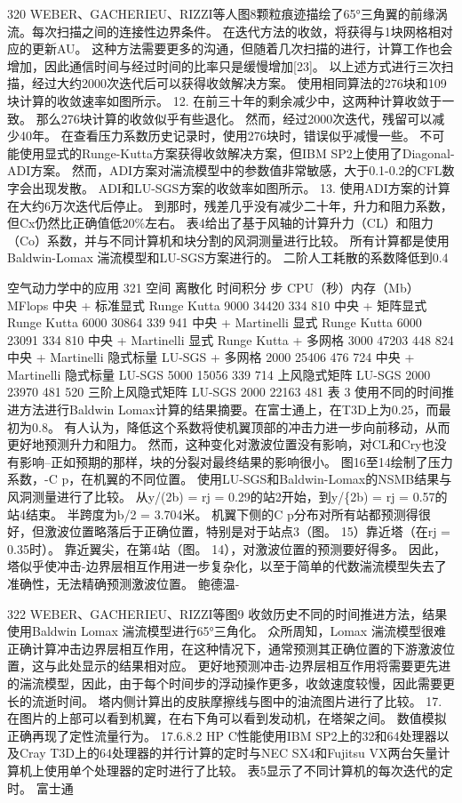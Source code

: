 \documentclass[UTF8,11pt,a4paper,openany,fontset=fandol]{ctexbook}
\begin{document}
320 WEBER、GACHERIEU、RIZZI等人图8颗粒痕迹描绘了65°三角翼的前缘涡流。每次扫描之间的连接性边界条件。 在迭代方法的收敛，将获得与1块网格相对应的更新AU。 这种方法需要更多的沟通，但随着几次扫描的进行，计算工作也会增加，因此通信时间与经过时间的比率只是缓慢增加[23]。 以上述方式进行三次扫描，经过大约2000次迭代后可以获得收敛解决方案。 使用相同算法的276块和109块计算的收敛速率如图所示。 12. 在前三十年的剩余减少中，这两种计算收敛于一致。 那么276块计算的收敛似乎有些退化。 然而，经过2000次迭代，残留可以减少40年。 在查看压力系数历史记录时，使用276块时，错误似乎减慢一些。 不可能使用显式的Runge-Kutta方案获得收敛解决方案，但IBM SP2上使用了Diagonal-ADI方案。 然而，ADI方案对湍流模型中的参数值非常敏感，大于0.1-0.2的CFL数字会出现发散。 ADI和LU-SGS方案的收敛率如图所示。 13. 使用ADI方案的计算在大约6万次迭代后停止。 到那时，残差几乎没有减少二十年，升力和阻力系数，但Cx仍然比正确值低20\%左右。 表4给出了基于风轴的计算升力（CL）和阻力（Co）系数，并与不同计算机和块分割的风洞测量进行比较。 所有计算都是使用Baldwin-Lomax 湍流模型和LU-SGS方案进行的。 二阶人工耗散的系数降低到0.4

空气动力学中的应用 321 空间 离散化 时间积分 步 CPU（秒）内存（Mb） MFlops 中央 + 标准显式 Runge Kutta 9000 34420 334 810 中央 + 矩阵显式 Runge Kutta 6000 30864 339 941 中央 + Martinelli 显式 Runge Kutta 6000 23091 334 810 中央 + Martinelli 显式 Runge Kutta + 多网格 3000 47203 448 824 中央 + Martinelli 隐式标量 LU-SGS + 多网格 2000 25406 476 724 中央 + Martinelli 隐式标量 LU-SGS 5000 15056 339 714 上风隐式矩阵 LU-SGS 2000 23970 481 520 三阶上风隐式矩阵 LU-SGS 2000 22163 481 表 3 使用不同的时间推进方法进行Baldwin Lomax计算的结果摘要。在富士通上，在T3D上为0.25，而最初为0.8。 有人认为，降低这个系数将使机翼顶部的冲击力进一步向前移动，从而更好地预测升力和阻力。 然而，这种变化对激波位置没有影响，对CL和Cry也没有影响--正如预期的那样，块的分裂对最终结果的影响很小。 图16至14绘制了压力系数，-C p，在机翼的不同位置。 使用LU-SGS和Baldwin-Lomax的NSMB结果与风洞测量进行了比较。 从y/(2b) = rj = 0.29的站2开始，到y/\{2b) = rj = 0.57的站4结束。 半跨度为b/2 = 3.704米。 机翼下侧的C p分布对所有站都预测得很好，但激波位置略落后于正确位置，特别是对于站点3（图。 15）靠近塔（在rj = 0.35时）。 靠近翼尖，在第4站（图。 14），对激波位置的预测要好得多。 因此，塔似乎使冲击-边界层相互作用进一步复杂化，以至于简单的代数湍流模型失去了准确性，无法精确预测激波位置。 鲍德温-

322 WEBER、GACHERIEU、RIZZI等图9 收敛历史不同的时间推进方法，结果使用Baldwin Lomax 湍流模型进行65°三角化。 众所周知，Lomax 湍流模型很难正确计算冲击边界层相互作用，在这种情况下，通常预测其正确位置的下游激波位置，这与此处显示的结果相对应。 更好地预测冲击-边界层相互作用将需要更先进的湍流模型，因此，由于每个时间步的浮动操作更多，收敛速度较慢，因此需要更长的流逝时间。 塔内侧计算出的皮肤摩擦线与图中的油流图片进行了比较。 17. 在图片的上部可以看到机翼，在右下角可以看到发动机，在塔架之间。 数值模拟正确再现了定性流量行为。 17.6.8.2 HP C性能使用IBM SP2上的32和64处理器以及Cray T3D上的64处理器的并行计算的定时与NEC SX4和Fujitsu VX两台矢量计算机上使用单个处理器的定时进行了比较。 表5显示了不同计算机的每次迭代的定时。 富士通
\end{document}
